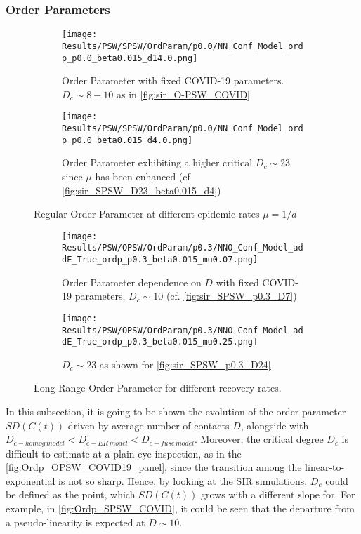 \documentclass[a4paper,10pt,twoside]{book} %
\theoremstyle{definition}
\begin{document}
\clearpage
\subsubsection*{Order Parameters}
\begin{figure}[ht]
	\begin{subfigure}[t]{0.48\linewidth}
		\centering
		\texttt{[image: Results/PSW/SPSW/OrdParam/p0.0/NN\_Conf\_Model\_ordp\_p0.0\_beta0.015\_d14.0.png]} 
		\caption{Order Parameter with fixed COVID-19 parameters. \newline $D_c \sim 8-10$ as in \autoref{fig:sir_O-PSW_COVID}}
		\label{fig:Ordp_SPSW_COVID-19_d14}
	\end{subfigure}
	\begin{subfigure}[t]{0.48\linewidth}
		\centering
		\texttt{[image: Results/PSW/SPSW/OrdParam/p0.0/NN\_Conf\_Model\_ordp\_p0.0\_beta0.015\_d4.0.png]}
		\caption{Order Parameter exhibiting a higher critical $D_c \sim 23$ since $\mu$ has been enhanced (cf \autoref{fig:sir_SPSW_D23_beta0.015_d4})}
		\label{fig:Ordp_SPSW_d4_COVID19}
	\end{subfigure}
	\caption{Regular Order Parameter at different epidemic rates $\mu = 1/d$}
	\label{fig:Ordp_SPSW_COVID}
\end{figure}

\begin{figure}[ht]
	\begin{subfigure}[t]{0.48\linewidth}
		\texttt{[image: Results/PSW/OPSW/OrdParam/p0.3/NNO\_Conf\_Model\_addE\_True\_ordp\_p0.3\_beta0.015\_mu0.07.png]}
		\caption{Order Parameter dependence on $D$ with fixed COVID-19 parameters. $D_c \sim 10$ \cite{Thurner::NetBasedExpl} (cf. \autoref{fig:sir_SPSW_p0.3_D7})}
		\label{fig:Ordp_SPSW_p0.3}
	\end{subfigure}
	\begin{subfigure}[t]{0.48\linewidth}
		\texttt{[image: Results/PSW/OPSW/OrdParam/p0.3/NNO\_Conf\_Model\_addE\_True\_ordp\_p0.3\_beta0.015\_mu0.25.png]}
		\caption{$D_c \sim 23$ as shown for \autoref{fig:sir_SPSW_p0.3_D24}}
		\label{fig:Ordp_SPSW_d4_p0.3}
	\end{subfigure}
	\caption{Long Range Order Parameter for different recovery rates.}
	\label{fig:Ordp_SPSW_COVID_p0.3}
\end{figure}
In this subsection, it is going to be shown the evolution of the order parameter $SD(C(t))$ driven by  average number of contacts $D$, alongside with $D_{c-homog \, model} < D_{c-ER \, model} < D_{c-fuse \, model}$. Moreover, the critical degree $D_c$ is difficult to estimate at a plain eye inspection, as in the \autoref{fig:Ordp_OPSW_COVID19_panel}, since the transition among the linear-to-exponential is not so sharp. Hence, by looking at the SIR simulations, $D_c$ could be defined as the point, which $SD(C(t))$ grows with a different slope for.
For example, in \autoref{fig:Ordp_SPSW_COVID}, it could be seen that the departure from a pseudo-linearity is expected at $D \sim 10$.
\end{document}
